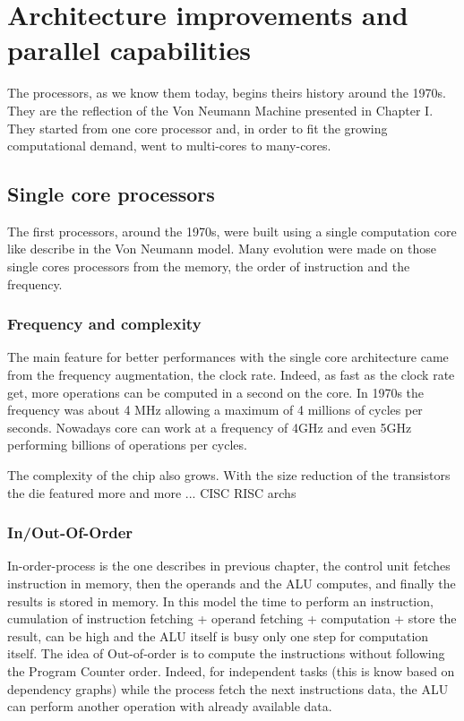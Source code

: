 \section{Architecture improvements and parallel capabilities}
The processors, as we know them today, begins theirs history around the 1970s.
They are the reflection of the Von Neumann Machine presented in Chapter I. 
They started from one core processor and, in order to fit the growing computational demand, went to multi-cores to many-cores. 

\subsection{Single core processors}
The first processors, around the 1970s, were built using a single computation core like describe in the Von Neumann model. 
Many evolution were made on those single cores processors from the memory, the order of instruction and the frequency.

\subsubsection{Frequency and complexity}
The main feature for better performances with the single core architecture came from the frequency augmentation, the clock rate. 
Indeed, as fast as the clock rate get, more operations can be computed in a second on the core. 
In 1970s the frequency was about 4 MHz allowing a maximum of 4 millions of cycles per seconds. 
Nowadays core can work at a frequency of 4GHz and even 5GHz performing billions of operations per cycles. 

The complexity of the chip also grows. 
With the size reduction of the transistors the die featured more and more ... CISC RISC archs

\subsubsection{In/Out-Of-Order} 
In-order-process is the one describes in previous chapter, the control unit fetches instruction in memory, then the operands and the ALU computes, and finally the results is stored in memory. 
In this model the time to perform an instruction, cumulation of instruction fetching + operand fetching + computation + store the result, can be high and the ALU itself is busy only one step for computation itself. The idea of Out-of-order is to compute the instructions without following the Program Counter order. 
Indeed, for independent tasks (this is know based on dependency graphs) while the process fetch the next instructions data, the ALU can perform another operation with already available data. 


